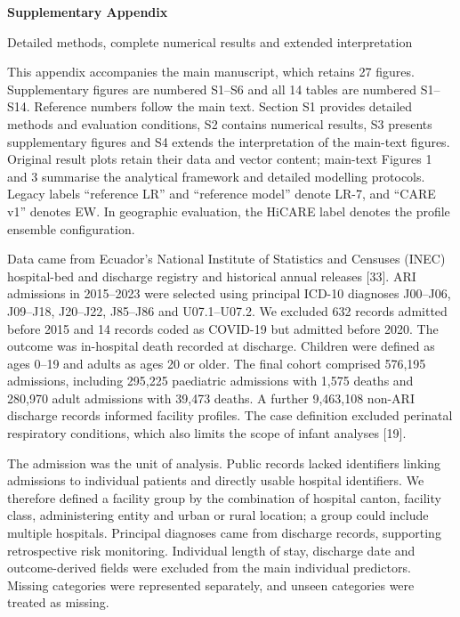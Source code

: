 \documentclass[11pt,a4paper]{article}
\newcommand{\mainheading}[1]{\par\needspace{4\baselineskip}\vspace{7pt}{\large\bfseries #1}\par\vspace{3pt}}
\newcommand{\subheading}[1]{\par\needspace{3\baselineskip}\vspace{5pt}{\bfseries #1}\par\vspace{1pt}}
\begin{document}
\fontsize{10.5}{13}\selectfont
\renewcommand{\thefigure}{S\arabic{figure}}\renewcommand{\thetable}{S\arabic{table}}\renewcommand{\theequation}{S\arabic{equation}}{\raggedright\LARGE\bfseries Supplementary Appendix\par}\vspace{5pt}
{\large Detailed methods, complete numerical results and extended interpretation\par}\vspace{10pt}
\mainheading{Guide to the Supplementary Appendix}
This appendix accompanies the main manuscript, which retains 27 figures. Supplementary figures are numbered S1–S6 and all 14 tables are numbered S1–S14. Reference numbers follow the main text. Section S1 provides detailed methods and evaluation conditions, S2 contains numerical results, S3 presents supplementary figures and S4 extends the interpretation of the main-text figures. Original result plots retain their data and vector content; main-text Figures 1 and 3 summarise the analytical framework and detailed modelling protocols. Legacy labels “reference LR” and “reference model” denote LR-7, and “CARE v1” denotes EW. In geographic evaluation, the HiCARE label denotes the profile ensemble configuration.

\mainheading{S1 Detailed methods and evaluation conditions}
\subheading{S1.1 Study cohort and unit of analysis}
Data came from Ecuador’s National Institute of Statistics and Censuses (INEC) hospital-bed and discharge registry and historical annual releases [33]. ARI admissions in 2015–2023 were selected using principal ICD-10 diagnoses J00–J06, J09–J18, J20–J22, J85–J86 and U07.1–U07.2. We excluded 632 records admitted before 2015 and 14 records coded as COVID-19 but admitted before 2020. The outcome was in-hospital death recorded at discharge. Children were defined as ages 0–19 and adults as ages 20 or older. The final cohort comprised 576,195 admissions, including 295,225 paediatric admissions with 1,575 deaths and 280,970 adult admissions with 39,473 deaths. A further 9,463,108 non-ARI discharge records informed facility profiles. The case definition excluded perinatal respiratory conditions, which also limits the scope of infant analyses [19].

The admission was the unit of analysis. Public records lacked identifiers linking admissions to individual patients and directly usable hospital identifiers. We therefore defined a facility group by the combination of hospital canton, facility class, administering entity and urban or rural location; a group could include multiple hospitals. Principal diagnoses came from discharge records, supporting retrospective risk monitoring. Individual length of stay, discharge date and outcome-derived fields were excluded from the main individual predictors. Missing categories were represented separately, and unseen categories were treated as missing.
\end{document}
